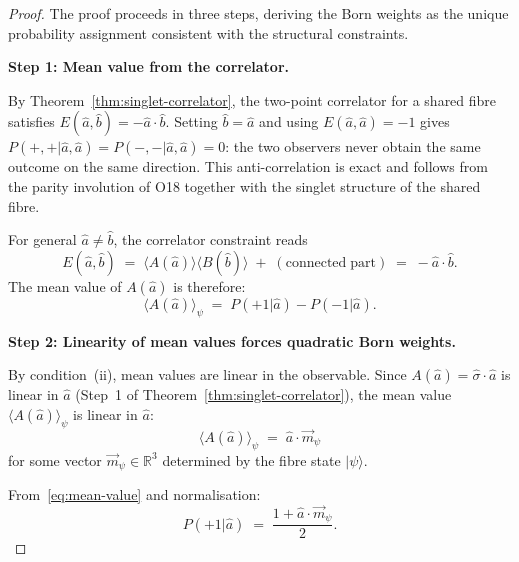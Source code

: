 \begin{proof}
  The proof proceeds in three steps, deriving the Born weights as the unique
  probability assignment consistent with the structural constraints.

  \textbf{Step 1: Mean value from the correlator.}

  By Theorem~\ref{thm:singlet-correlator}, the two-point correlator for a
  shared fibre satisfies $E(\hat{a},\hat{b}) = -\hat{a}\cdot\hat{b}$.
  Setting $\hat{b} = \hat{a}$ and using $E(\hat{a},\hat{a}) = -1$ gives
  $P(+,+|\hat{a},\hat{a}) = P(-,-|\hat{a},\hat{a}) = 0$: the two
  observers never obtain the same outcome on the same direction.
  This anti-correlation is exact and follows from the parity involution
  of O18 together with the singlet structure of the shared fibre.

  For general $\hat{a} \neq \hat{b}$, the correlator constraint reads
  \begin{equation}
    E(\hat{a},\hat{b})
    \;=\;
    \langle A(\hat{a}) \rangle \langle B(\hat{b}) \rangle
    \;+\; \mathrm{(connected\;part)}
    \;=\; -\hat{a}\cdot\hat{b}.
  \end{equation}
  The mean value of $A(\hat{a})$ is therefore:
  \begin{equation}
    \label{eq:mean-value}
    \langle A(\hat{a}) \rangle_\psi
    \;=\;
    P(+1|\hat{a}) - P(-1|\hat{a}).
  \end{equation}

  \textbf{Step 2: Linearity of mean values forces quadratic Born weights.}

  By condition~(ii), mean values are linear in the observable.
  Since $A(\hat{a}) = \hat{\sigma}\cdot\hat{a}$ is linear in $\hat{a}$
  (Step~1 of Theorem~\ref{thm:singlet-correlator}), the mean value
  $\langle A(\hat{a})\rangle_\psi$ is linear in $\hat{a}$:
  \begin{equation}
    \langle A(\hat{a}) \rangle_\psi
    \;=\;
    \hat{a} \cdot \vec{m}_\psi
  \end{equation}
  for some vector $\vec{m}_\psi \in \mathbb{R}^3$ determined by the fibre
  state $|\psi\rangle$.

  From~\eqref{eq:mean-value} and normalisation:
  \begin{equation}
    P(+1|\hat{a})
    \;=\;
    \frac{1 + \hat{a}\cdot\vec{m}_\psi}{2}.
  \end{equation}


\end{proof}
